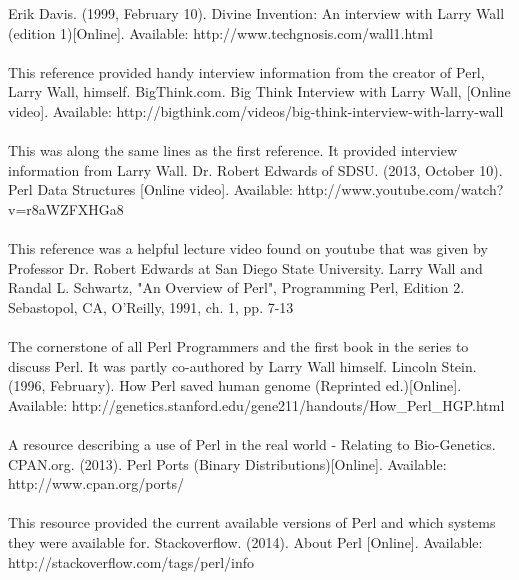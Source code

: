 \documentclass[11pt,a4paper]{article}
\begin{document}
\newpage

\begin{thebibliography}{20}
        Erik Davis.
        (1999, February 10).
        Divine Invention: An interview with Larry Wall (edition 1)[Online].
        Available:
        http://www.techgnosis.com/wall1.html
        \\\\This reference provided handy interview information from the creator of Perl, Larry Wall, himself.
        BigThink.com.
        Big Think Interview with Larry Wall,
        [Online video].
        Available:
        http://bigthink.com/videos/big-think-interview-with-larry-wall
        \\\\This was along the same lines as the first reference. It provided interview information from Larry Wall.
        Dr. Robert Edwards of SDSU.
        (2013, October 10).
        Perl Data Structures [Online video].
        Available:
        http://www.youtube.com/watch?v=r8aWZFXHGa8
        \\\\ This reference was a helpful lecture video found on youtube that was given by Professor  Dr. Robert Edwards at San Diego State University.
        Larry Wall and Randal L. Schwartz,
        "An Overview of Perl",
        Programming Perl,
        Edition 2.
        Sebastopol, CA,
        O'Reilly,
        1991,
        ch. 1,
        pp. 7-13
        \\\\The cornerstone of all Perl Programmers and  the first book in the series to discuss Perl. It was partly co-authored by Larry Wall himself. 
        Lincoln Stein.
        (1996, February).
        How Perl saved human genome (Reprinted ed.)[Online].
        Available:
        http://genetics.stanford.edu/gene211/handouts/How\_Perl\_HGP.html
        \\\\A resource describing a use of Perl in the real world - Relating to Bio-Genetics.
        CPAN.org.
        (2013).
        Perl Ports (Binary Distributions)[Online].
        Available:
        http://www.cpan.org/ports/
        \\\\This resource provided the current available versions of Perl and which systems they were available for.
        Stackoverflow.
        (2014).
        About Perl [Online].
        Available: http://stackoverflow.com/tags/perl/info

\end{thebibliography}
\end{document}
